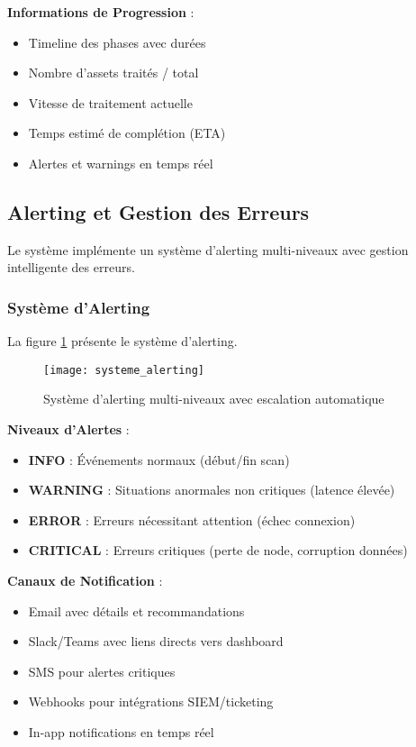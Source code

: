 \textbf{Informations de Progression} :
\begin{itemize}
    \item Timeline des phases avec durées
    \item Nombre d'assets traités / total
    \item Vitesse de traitement actuelle
    \item Temps estimé de complétion (ETA)
    \item Alertes et warnings en temps réel
\end{itemize}

\subsection{Alerting et Gestion des Erreurs}

Le système implémente un système d'alerting multi-niveaux avec gestion intelligente des erreurs.

\subsubsection{Système d'Alerting}

La figure \ref{fig:systeme_alerting} présente le système d'alerting.

\begin{figure}[htpb]
\centering
\texttt{[image: systeme\_alerting]}
\caption{Système d'alerting multi-niveaux avec escalation automatique}
\label{fig:systeme_alerting}
\end{figure}

\textbf{Niveaux d'Alertes} :
\begin{itemize}
    \item \textbf{INFO} : Événements normaux (début/fin scan)
    \item \textbf{WARNING} : Situations anormales non critiques (latence élevée)
    \item \textbf{ERROR} : Erreurs nécessitant attention (échec connexion)
    \item \textbf{CRITICAL} : Erreurs critiques (perte de node, corruption données)
\end{itemize}

\textbf{Canaux de Notification} :
\begin{itemize}
    \item Email avec détails et recommandations
    \item Slack/Teams avec liens directs vers dashboard
    \item SMS pour alertes critiques
    \item Webhooks pour intégrations SIEM/ticketing
    \item In-app notifications en temps réel
\end{itemize}

